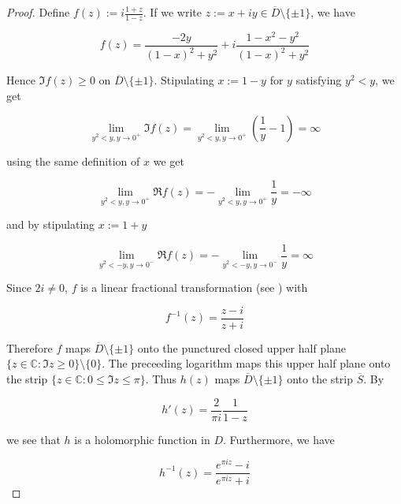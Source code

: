 \begin{proof}
	Define $\displaystyle f(z) := i\frac{1 + z}{1 - z}$. If we write $z := x + iy \in \overline{D} \setminus \{\pm 1\}$, we have 

	\begin{equation}
		f(z) = \frac{-2y}{(1 - x)^2 + y^2} + i \frac{1 - x^2 - y^2}{(1 - x)^2 + y^2}
		\label{eq:rep_lft}
	\end{equation}

	Hence $\Im f(z) \geq 0$ on $\overline{D}\setminus \{\pm 1\}$. Stipulating $x := 1 - y$ for $y$ satisfying $y^2 < y$, we get

	\begin{equation*}
		\lim\limits_{y^2 < y, y \rightarrow 0^+} \Im f(z) = \lim\limits_{y^2 < y, y \rightarrow 0^+} \left( \frac{1}{y} - 1 \right) = \infty
	\end{equation*}

	using the same definition of $x$ we get

	\begin{equation*}
		\lim\limits_{y^2 < y, y \rightarrow 0^+} \Re f(z) = -\lim\limits_{y^2 < y, y \rightarrow 0^+} \frac{1}{y} = -\infty
	\end{equation*}

	and by stipulating $x := 1 + y$

	\begin{equation*}
		\lim\limits_{y^2 < -y, y \rightarrow 0^-} \Re f(z) = -\lim\limits_{y^2 < -y, y \rightarrow 0^-} \frac{1}{y} = \infty	
	\end{equation*}


	Since $2i \neq 0$, $f$ is a linear fractional transformation (see \cite[279]{rudin:rc_analysis:1987}) with

	\begin{equation*}
		f^{-1}(z) = \frac{z - i}{z + i}
	\end{equation*}

	Therefore $f$ maps $\overline{D}\setminus \{\pm 1\}$ onto the punctured closed upper half plane $\{z \in \mathbb{C} : \Im z \geq 0\} \setminus \{0\}$. The preceeding logarithm maps this upper half plane onto the strip $\{z \in \mathbb{C} : 0 \leq \Im z \leq \pi \}$. Thus $h(z)$ maps $\overline{D}\setminus \{\pm 1\}$ onto the strip $\overline{S}$. By

\begin{equation}
	h'(z) = \frac{2}{\pi i} \frac{1}{1 - z}
	\label{eq:h_diff}
\end{equation}

	we see that $h$ is a holomorphic function in $D$. Furthermore, we have

	\begin{equation*}
		h^{-1}(z) = \frac{e^{\pi iz} - i}{e^{\pi i z} + i}
	\end{equation*}
\end{proof}

